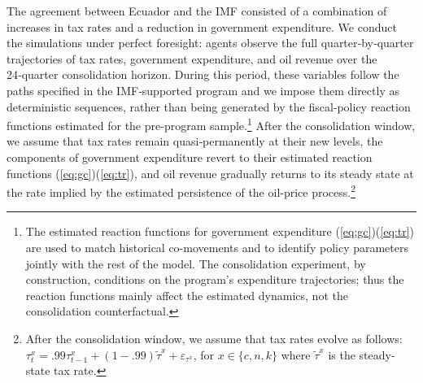 \documentclass[12pt]{article}
\begin{document}
The agreement between Ecuador and the IMF consisted of a combination of increases in tax rates and a reduction in government expenditure. We conduct the simulations under perfect foresight: agents observe the full quarter‑by‑quarter trajectories of tax rates, government expenditure, and oil revenue over the 24‑quarter consolidation horizon. During this period, these variables follow the paths specified in the IMF‑supported program and we impose them directly as deterministic sequences, rather than being generated by the fiscal‑policy reaction functions estimated for the pre‑program sample.\footnote{The estimated reaction functions for government expenditure (\ref{eq:gc})\textendash (\ref{eq:tr}) are used to match historical co-movements and to identify policy parameters jointly with the rest of the model. The consolidation experiment, by construction, conditions on the program’s expenditure trajectories; thus the reaction functions mainly affect the estimated dynamics, not the consolidation counterfactual.} After the consolidation window, we assume that tax rates remain quasi‑permanently at their new levels, the components of government expenditure revert to their estimated reaction functions (\ref{eq:gc})\textendash (\ref{eq:tr}), and oil revenue gradually returns to its steady state at the rate implied by the estimated persistence of the oil‑price process.\footnote{After the consolidation window, we assume that tax rates evolve as follows: $\tau^x_t = .99\tau^x_{t-1} + (1-.99)\tilde{\tau}^x + \varepsilon _{\tau^x}$, for $x\in \{c,n,k\}$ where $\tilde{\tau}^x$ is the steady-state tax rate.}
\end{document}
